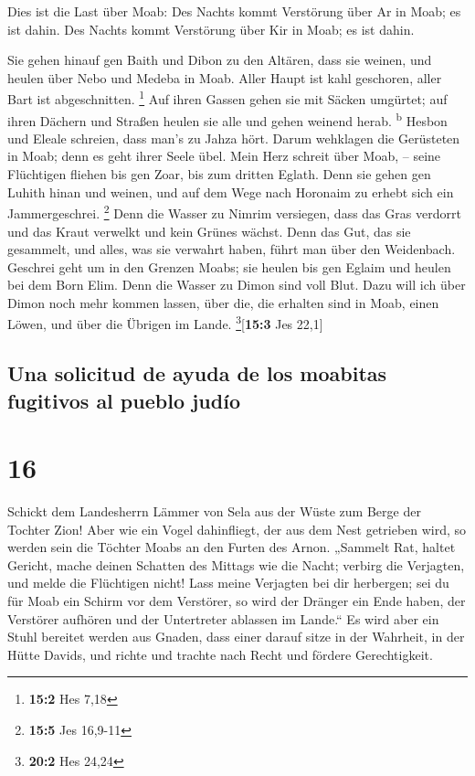  Dies ist die Last über Moab: Des Nachts kommt Verstörung
über Ar in Moab; es ist dahin. Des Nachts kommt Verstörung über Kir in
Moab; es ist dahin.

 Sie gehen hinauf gen Baith und Dibon zu den Altären, dass
sie weinen, und heulen über Nebo und Medeba in Moab. Aller Haupt ist
kahl geschoren, aller Bart ist abgeschnitten. \footnote{\textbf{15:2}
  Hes 7,18}  Auf ihren Gassen gehen sie mit Säcken
umgürtet; auf ihren Dächern und Straßen heulen sie alle und gehen
weinend herab. \textsuperscript{b}  Hesbon und Eleale
schreien, dass man's zu Jahza hört. Darum wehklagen die Gerüsteten in
Moab; denn es geht ihrer Seele übel.  Mein Herz schreit
über Moab, -- seine Flüchtigen fliehen bis gen Zoar, bis zum dritten
Eglath. Denn sie gehen gen Luhith hinan und weinen, und auf dem Wege
nach Horonaim zu erhebt sich ein Jammergeschrei. \footnote{\textbf{15:5}
  Jes 16,9-11}  Denn die Wasser zu Nimrim versiegen, dass
das Gras verdorrt und das Kraut verwelkt und kein Grünes wächst.
 Denn das Gut, das sie gesammelt, und alles, was sie
verwahrt haben, führt man über den Weidenbach.  Geschrei
geht um in den Grenzen Moabs; sie heulen bis gen Eglaim und heulen bei
dem Born Elim.  Denn die Wasser zu Dimon sind voll Blut.
Dazu will ich über Dimon noch mehr kommen lassen, über die, die erhalten
sind in Moab, einen Löwen, und über die Übrigen im Lande.
\footnote{\textbf{20:2} Hes 24,24}{[}\textbf{15:3} Jes 22,1{]}

\hypertarget{una-solicitud-de-ayuda-de-los-moabitas-fugitivos-al-pueblo-juduxedo}{%
\subsection{Una solicitud de ayuda de los moabitas fugitivos al pueblo
judío}\label{una-solicitud-de-ayuda-de-los-moabitas-fugitivos-al-pueblo-juduxedo}}

\hypertarget{section-15}{%
\section{16}\label{section-15}}

 Schickt dem Landesherrn Lämmer von Sela aus der Wüste zum
Berge der Tochter Zion!  Aber wie ein Vogel dahinfliegt,
der aus dem Nest getrieben wird, so werden sein die Töchter Moabs an den
Furten des Arnon.  „Sammelt Rat, haltet Gericht, mache
deinen Schatten des Mittags wie die Nacht; verbirg die Verjagten, und
melde die Flüchtigen nicht!  Lass meine Verjagten bei dir
herbergen; sei du für Moab ein Schirm vor dem Verstörer, so wird der
Dränger ein Ende haben, der Verstörer aufhören und der Untertreter
ablassen im Lande.``  Es wird aber ein Stuhl bereitet
werden aus Gnaden, dass einer darauf sitze in der Wahrheit, in der Hütte
Davids, und richte und trachte nach Recht und fördere Gerechtigkeit.

